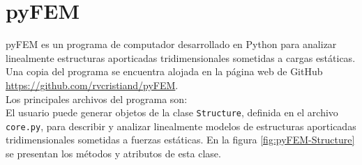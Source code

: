 \chapter{pyFEM}
\label{cha:pyFEM}

pyFEM es un programa de computador desarrollado en Python para analizar linealmente estructuras aporticadas tridimensionales sometidas a cargas estáticas. Una copia del programa se encuentra alojada en la página web de GitHub \url{https://github.com/rvcristiand/pyFEM}.\\

Los principales archivos del programa son:\\

\bigskip
El usuario puede generar objetos de la clase \verb|Structure|, definida en el archivo \verb|core.py|, para describir y analizar linealmente modelos de estructuras aporticadas tridimensionales sometidas a fuerzas estáticas. En la figura \ref{fig:pyFEM-Structure} se presentan los métodos y atributos de esta clase.\\

